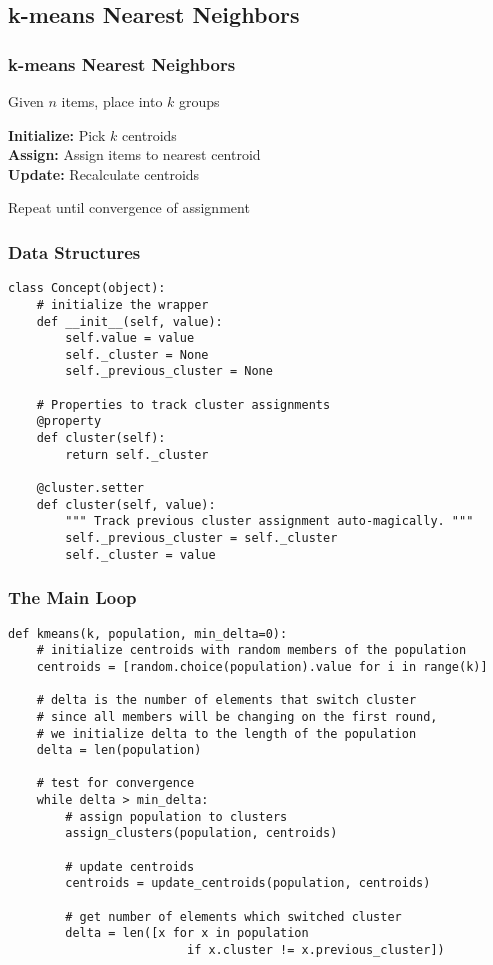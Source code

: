 \documentclass{beamer}
\begin{document}
\subsection{k-means Nearest Neighbors}
\begin{frame}
\frametitle{k-means Nearest Neighbors}
Given $n$ items, place into $k$ groups\\

\bigskip

\textbf{Initialize:} Pick $k$ centroids\\
\textbf{Assign:} Assign items to nearest centroid\\
\textbf{Update:} Recalculate centroids\\

\bigskip

Repeat until convergence of assignment

\end{frame}

\begin{frame}[fragile]
\frametitle{Data Structures}
\begin{verbatim}
class Concept(object):
    # initialize the wrapper
    def __init__(self, value):
        self.value = value
        self._cluster = None
        self._previous_cluster = None

    # Properties to track cluster assignments
    @property
    def cluster(self):
        return self._cluster
        
    @cluster.setter
    def cluster(self, value):
        """ Track previous cluster assignment auto-magically. """
        self._previous_cluster = self._cluster
        self._cluster = value
\end{verbatim}
\end{frame}

\begin{frame}[fragile]
\frametitle{The Main Loop}
\begin{verbatim}
def kmeans(k, population, min_delta=0):
    # initialize centroids with random members of the population
    centroids = [random.choice(population).value for i in range(k)]
   
    # delta is the number of elements that switch cluster
    # since all members will be changing on the first round,
    # we initialize delta to the length of the population
    delta = len(population)

    # test for convergence
    while delta > min_delta:
        # assign population to clusters
        assign_clusters(population, centroids)

        # update centroids
        centroids = update_centroids(population, centroids)
        
        # get number of elements which switched cluster
        delta = len([x for x in population 
                         if x.cluster != x.previous_cluster])
\end{verbatim}
\end{frame}
\end{document}
